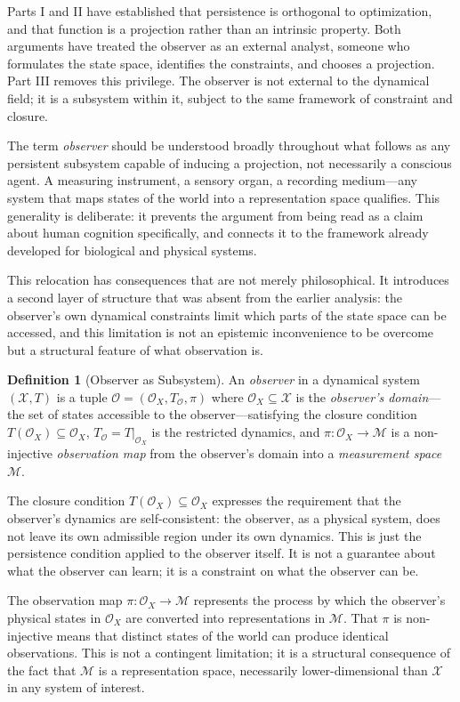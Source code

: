 \documentclass[12pt, a4paper, oneside]{article}
\theoremstyle{plain}
\theoremstyle{definition}
\newtheorem{definition}[theorem]{Definition}
\theoremstyle{remark}
\newcommand{\X}{\mathcal{X}}
\newcommand{\M}{\mathcal{M}}
\newcommand{\Obs}{\mathcal{O}}
\newcommand{\T}{T}
\newcommand{\proj}{\pi}
\begin{document}
Parts I and II have established that persistence is orthogonal to optimization, and that function is a projection rather than an intrinsic property. Both arguments have treated the observer as an external analyst, someone who formulates the state space, identifies the constraints, and chooses a projection. Part III removes this privilege. The observer is not external to the dynamical field; it is a subsystem within it, subject to the same framework of constraint and closure.

The term \emph{observer} should be understood broadly throughout what follows as any persistent subsystem capable of inducing a projection, not necessarily a conscious agent. A measuring instrument, a sensory organ, a recording medium---any system that maps states of the world into a representation space qualifies. This generality is deliberate: it prevents the argument from being read as a claim about human cognition specifically, and connects it to the framework already developed for biological and physical systems.

This relocation has consequences that are not merely philosophical. It introduces a second layer of structure that was absent from the earlier analysis: the observer's own dynamical constraints limit which parts of the state space can be accessed, and this limitation is not an epistemic inconvenience to be overcome but a structural feature of what observation is.

\begin{definition}[Observer as Subsystem]
An \emph{observer} in a dynamical system $(\X, \T)$ is a tuple $\Obs = (\Obs_X, \T_\Obs, \proj)$ where $\Obs_X \subseteq \X$ is the \emph{observer's domain}---the set of states accessible to the observer---satisfying the closure condition $\T(\Obs_X) \subseteq \Obs_X$, $\T_\Obs = \T|_{\Obs_X}$ is the restricted dynamics, and $\proj : \Obs_X \to \M$ is a non-injective \emph{observation map} from the observer's domain into a \emph{measurement space} $\M$.
\end{definition}

The closure condition $\T(\Obs_X) \subseteq \Obs_X$ expresses the requirement that the observer's dynamics are self-consistent: the observer, as a physical system, does not leave its own admissible region under its own dynamics. This is just the persistence condition applied to the observer itself. It is not a guarantee about what the observer can learn; it is a constraint on what the observer can be.

The observation map $\proj : \Obs_X \to \M$ represents the process by which the observer's physical states in $\Obs_X$ are converted into representations in $\M$. That $\proj$ is non-injective means that distinct states of the world can produce identical observations. This is not a contingent limitation; it is a structural consequence of the fact that $\M$ is a representation space, necessarily lower-dimensional than $\X$ in any system of interest.
\end{document}

